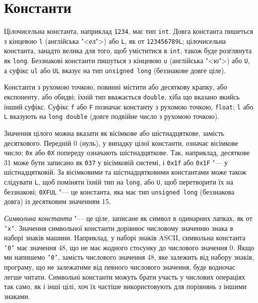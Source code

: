 \documentclass[a4paper,12pt]{book}
\begin{document}
\section{Константи}

\label{f0:ch2.3}
  Цілочисельна константа, наприклад \texttt{1234}, має тип \texttt{int}. Довга константа
  пишеться з кінцевою \texttt{l} (англійська "<ел">) або \texttt{L}, як от
  \texttt{123456789L}; цілочисельна константа, занадто велика для того, щоб уміститися в
  \texttt{int}, також буде розглянута як \texttt{long}. Беззнакові константи пишуться з
  кінцевою \texttt{u} (англійська "<ю">) або \texttt{U}, а суфікс \texttt{ul}
  або \texttt{UL} вказує на тип \texttt{unsigned long} (беззнакове довге ціле).

  Константи з рухомою точкою, повинні містити або десяткову крапку, або експоненту, або
  обидві; їхній тип вважається \texttt{double}, хіба що вказано якийсь інший суфікс.
  Суфікс \texttt{f} або \texttt{F} позначає константу з рухомою точкою, \texttt{float};
  \texttt{l} або \texttt{L} вказують на \texttt{long double} (довге подвійне число з
  рухомою точкою).

  Значення цілого можна вказати як вісімкове або шістнадцяткове, замість десяткового.
  Передній 0 (нуль), у випадку цілої константи, означає вісімкове число; \texttt{0x} або
  \texttt{0X} попереду означають шістнадцяткове. Так, наприклад, десяткове 31 може бути
  записано як \texttt{037} у вісімковій системі, і \texttt{0x1f} або \texttt{0x1F} "---
  у шістнадцятковій. За вісімковими та шістнадцятковими константами може також слідувати
  \texttt{L}, щоб поміняти їхній тип на \texttt{long}, або \texttt{U}, щоб перетворити їх
  на беззнакові; \texttt{0XFUL} "--- це константа, яка має тип \texttt{unsigned long}
  (беззнакова довга) із десятковим значенням 15.

  \textit{Символьна константа} "--- це ціле, записане як символ в одинарних лапках, як от
  \texttt{'x'}. Значення символьної константи дорівнює числовому значенню знака в наборі
  знаків машини. Наприклад, у наборі знаків ASCII, символьна константа \texttt{'0'} має
  значення 48, що не має жодного стосунку до числового значення 0. Якщо ми напишемо
  \texttt{'0'}, замість числового значення 48, яке залежить від набору знаків, програму,
  що не залежатиме від певного числового значення, буде водночас легше читати. Символьні
  константи можуть брати участь у числових операціях так само, як і інші цілі, хоч їх
  частіше використовують для порівнянь з іншими знаками.
\end{document}
